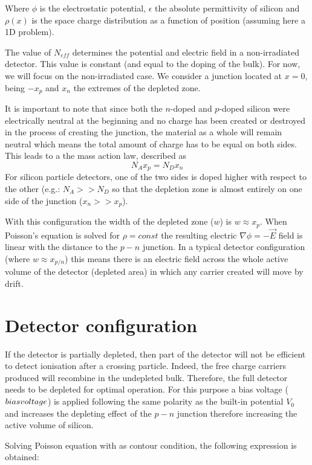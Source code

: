 Where $\phi$ is the electrostatic potential, $\epsilon$ the absolute
permittivity of silicon and $\rho(x)$ is the space charge distribution as a
function of position (assuming here a 1D problem).

The value of $N_{eff}$ determines the potential and electric field in a
non-irradiated detector. This value is constant (and equal to the doping of the
bulk). For now, we will focus on the non-irradiated case. We consider a junction
located at $x=0$, being $-x_p$ and $x_n$ the extremes of the depleted zone.

It is important to note that since both the $n$-doped and $p$-doped silicon were
electrically neutral at the beginning and no charge has been created or
destroyed in the process of creating the junction, the material as a whole will
remain neutral which means the total amount of charge has to be equal on both
sides. This leads to a the mass action law, described as \[N_A x_p = N_D x_n\] 
For silicon particle detectors, one of the two sides is doped higher with
respect to the other (e.g.: $N_A >> N_D$  so that the depletion zone is almost
entirely on one side of the junction ($x_n >> x_p$). 

With this configuration the width of the depleted zone ($w$) is $w \approx x_p$.
When Poisson's equation is solved for $\rho = const$ the resulting electric
$\nabla \phi = -\overrightarrow {E}$ field is linear with the distance to the $p-n$
junction. In a typical detector configuration (where $w \approx x_{p/n}$) this
means there is an electric field across the whole active volume of the detector
(depleted area) in which any carrier created will move by drift. 


\section{Detector configuration}
\label{sec:detConfig}

If the detector is partially depleted, then part of the detector will not be
efficient to detect ionisation after a crossing particle. Indeed, the free
charge carriers produced will recombine in the undepleted bulk. Therefore, the
full detector needs to be depleted for optimal operation. For this purpose a
bias voltage ($bias voltage$) is applied following the same polarity as the built-in
potential $V_0$ and increases the depleting effect of the $p-n$ junction
therefore increasing the active volume of silicon. 

Solving Poisson equation with \vias as contour condition, the following
expression is obtained: 

